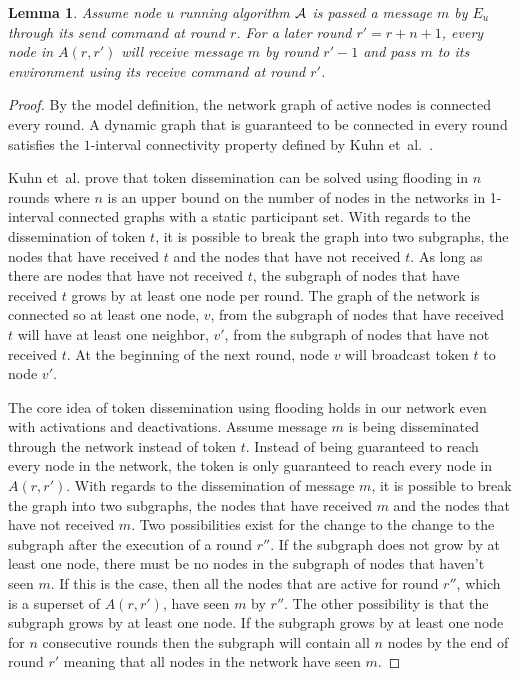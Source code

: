 \documentclass[english]{article}
\newtheorem{lemma}[theorem]{Lemma}
\begin{document}
\begin{lemma}
\label{RBDeactivationReceive}
Assume node $u$ running algorithm $\cal A$ is passed a message $m$ by $E_u$ through its \textit{send} command at round $r$. For a later round $r' = r + n + 1$, every node in $A(r,r')$ will receive message $m$ by round $r'-1$ and pass $m$ to its environment using its \textit{receive} command at round $r'$. 
\end{lemma}
\begin{proof}

By the model definition, the network graph of active nodes is connected every round. A dynamic graph that is guaranteed to be connected in every round satisfies the $1$-interval connectivity property defined by Kuhn et~al.~\cite{Kuhn:2010}.

Kuhn et~al. prove that token dissemination can be solved using flooding in $n$ rounds where $n$ is an upper bound on the number of nodes in the networks in 1-interval connected graphs with a static participant set. With regards to the dissemination of token $t$, it is possible to break the graph into two subgraphs, the nodes that have received $t$ and the nodes that have not received $t$. As long as there are nodes that have not received $t$, the subgraph of nodes that have received $t$ grows by at least one node per round. The graph of the network is connected so at least one node, $v$, from the subgraph of nodes that have received $t$ will have at least one neighbor, $v'$, from the subgraph of nodes that have not received $t$. At the beginning of the next round, node $v$ will broadcast token $t$ to node $v'$.

The core idea of token dissemination using flooding holds in our network even with activations and deactivations. Assume message $m$ is being disseminated through the network instead of token $t$. Instead of being guaranteed to reach every node in the network, the token is only guaranteed to reach every node in $A(r,r')$. With regards to the dissemination of message $m$, it is possible to break the graph into two subgraphs, the nodes that have received $m$ and the nodes that have not received $m$. Two possibilities exist for the change to the change to the subgraph after the execution of a round $r''$. If the subgraph does not grow by at least one node, there must be no nodes in the subgraph of nodes that haven't seen $m$. If this is the case, then all the nodes that are active for round $r''$, which is a superset of $A(r,r')$, have seen $m$ by $r''$. The other possibility is that the subgraph grows by at least one node. If the subgraph grows by at least one node for $n$ consecutive rounds then the subgraph will contain all $n$ nodes by the end of round $r'$ meaning that all nodes in the network have seen $m$.


\end{proof}
\end{document}
